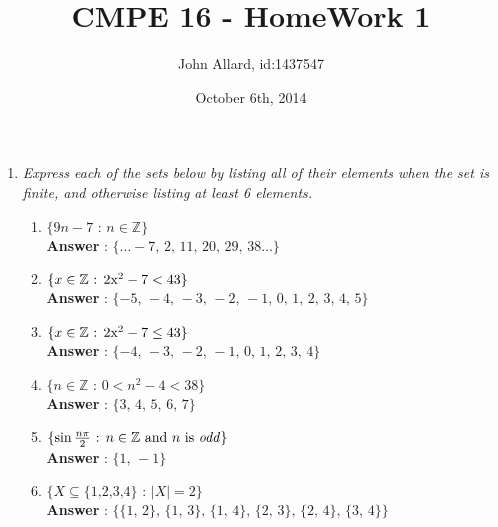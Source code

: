 \documentclass[a4paper,11pt]{article}
\title{CMPE 16 - HomeWork 1}
\author{John Allard, id:1437547}
\date{October 6th, 2014}
\begin{document}
\maketitle

\begin{enumerate}

\item \emph{Express each of the sets below by listing all of their elements when the set is finite, and otherwise listing at least 6 elements.}

  \begin{enumerate}
  \item \( \lbrace 9n - 7\text{ : }n \in \mathbb{Z}  \rbrace \) \\
  \textbf{Answer} : \( \lbrace \ldots -7 \text{, } 2 \text{, } 11 \text{, } 20 \text{, } 29 \text{, } 38 \ldots\rbrace \) 
  \item \( \lbrace x \in \mathbb{Z} \text{ : } 2$x$^2-7 < 43 \rbrace \) \\
  \textbf{Answer} : \( \lbrace -5 \text{, } -4 \text{, } -3 \text{, } -2 \text{, } -1 \text{, } 0 \text{, } 1 \text{, } 2 \text{, } 3 \text{, } 4 \text{, } 5  \rbrace \) 
  \item \( \lbrace x \in \mathbb{Z} \text{ : } 2$x$^2-7 \leq 43 \rbrace \) \\
  \textbf{Answer} : \( \lbrace -4 \text{, } -3 \text{, } -2 \text{, } -1 \text{, } 0 \text{, } 1 \text{, } 2 \text{, } 3 \text{, } 4  \rbrace \) 
  \item \( \lbrace n \in \mathbb{Z} \text{ : } 0 < n^2 - 4 < 38 \rbrace \) \\
  \textbf{Answer} : \( \lbrace 3 \text{, } 4 \text{, } 5 \text{, } 6 \text{, } 7 \rbrace \) 
  \item \( \lbrace  \sin{\frac{n\pi}{2}} \text{ : } n \in \mathbb{Z} \text{ and $n$ is \emph{odd}} \rbrace \) \\
  \textbf{Answer} : \( \lbrace 1 \text{, } -1\rbrace \) 
  \item \( \lbrace  X \subseteq \lbrace 1 \text{,} 2 \text{,} 3 \text{,} 4 \rbrace \text{ : } \vert X \vert = 2 \rbrace \) \\
  \textbf{Answer} : \( \lbrace 
  \lbrace 1 \text{, } 2 \rbrace \text{, } 
  \lbrace 1 \text{, } 3 \rbrace \text{, } 
  \lbrace 1 \text{, } 4 \rbrace \text{, } 
  \lbrace 2 \text{, } 3 \rbrace \text{, } 
  \lbrace 2 \text{, } 4 \rbrace \text{, } 
  \lbrace 3 \text{, } 4 \rbrace
  \rbrace \) 


\end{enumerate}
\end{enumerate}
\end{document}
